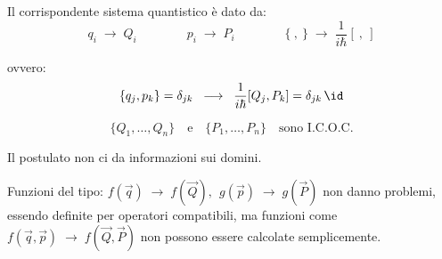 \begin{postulato6}
    Il corrispondente sistema quantistico è dato da:
\[
q_i \;\longrightarrow\; Q_i
\qquad\qquad
p_i \;\longrightarrow\; P_i
\qquad\qquad
\{\ , \ \} \;\longrightarrow\; \frac{1}{i\hbar}[\  , \ ]
\]

ovvero:
\[
\{ q_j, p_k \} = \delta_{jk}
\;\;\longrightarrow\;\;
\frac{1}{i\hbar}[Q_j, P_k] = \delta_{jk}\,\id
\]

\[
\{ Q_1, \dots, Q_n \} \quad\text{e}\quad \{ P_1, \dots, P_n \}
\quad\text{sono I.C.O.C.}
\]
\end{postulato6}

\begin{remark}
    Il postulato non ci da informazioni sui domini.
\end{remark}

\begin{remark}
    Funzioni del tipo: \(f(\vec{q}) \;\longrightarrow\; f(\vec{Q}), \ \ g(\vec{p}) \;\longrightarrow\; g(\vec{P})\) 
    non danno problemi, essendo definite per operatori compatibili, ma funzioni come\(f(\vec{q},\vec{p}) \;\longrightarrow\; f(\vec{Q}, \vec{P})\) non possono essere calcolate semplicemente.
\end{remark}

